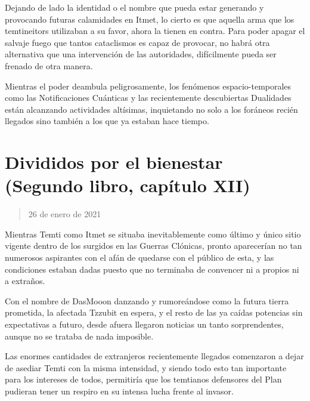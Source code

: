 \documentclass[
  spanish,
]{book}
\begin{document}
Dejando de lado la identidad o el nombre que pueda estar generando y provocando futuras calamidades en Itmet, lo cierto es que aquella arma que los temtineitors utilizaban a su favor, ahora la tienen en contra. Para poder apagar el salvaje fuego que tantos cataclismos es capaz de provocar, no habrá otra alternativa que una intervención de las autoridades, difícilmente pueda ser frenado de otra manera.

Mientras el poder deambula peligrosamente, los fenómenos espacio-temporales como las Notificaciones Cuánticas y las recientemente descubiertas Dualidades están alcanzando actividades altísimas, inquietando no solo a los foráneos recién llegados sino también a los que ya estaban hace tiempo.

\hypertarget{divididos-por-el-bienestar-segundo-libro-capuxedtulo-xii}{%
\section{Divididos por el bienestar (Segundo libro, capítulo XII)}\label{divididos-por-el-bienestar-segundo-libro-capuxedtulo-xii}}

\begin{quote}
26 de enero de 2021
\end{quote}

Mientras Temti como Itmet se situaba inevitablemente como último y único sitio vigente dentro de los surgidos en las Guerras Clónicas, pronto aparecerían no tan numerosos aspirantes con el afán de quedarse con el público de esta, y las condiciones estaban dadas puesto que no terminaba de convencer ni a propios ni a extraños.

Con el nombre de DasMooon danzando y rumoreándose como la futura tierra prometida, la afectada Tzzubit en espera, y el resto de las ya caídas potencias sin expectativas a futuro, desde afuera llegaron noticias un tanto sorprendentes, aunque no se trataba de nada imposible.

Las enormes cantidades de extranjeros recientemente llegados comenzaron a dejar de asediar Temti con la misma intensidad, y siendo todo esto tan importante para los intereses de todos, permitiría que los temtianos defensores del Plan pudieran tener un respiro en su intensa lucha frente al invasor.
\end{document}
